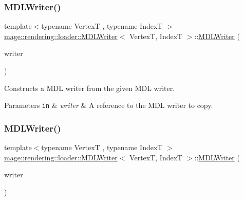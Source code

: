 \subsubsection{\texorpdfstring{M\+D\+L\+Writer()}{MDLWriter()}\hspace{0.1cm}{\footnotesize\ttfamily [2/3]}}
{\footnotesize\ttfamily template$<$typename VertexT , typename IndexT $>$ \\
\hyperlink{classmage_1_1rendering_1_1loader_1_1_m_d_l_writer}{mage\+::rendering\+::loader\+::\+M\+D\+L\+Writer}$<$ VertexT, IndexT $>$\+::\hyperlink{classmage_1_1rendering_1_1loader_1_1_m_d_l_writer}{M\+D\+L\+Writer} (\begin{DoxyParamCaption}\item[{const \hyperlink{classmage_1_1rendering_1_1loader_1_1_m_d_l_writer}{M\+D\+L\+Writer}$<$ VertexT, IndexT $>$ \&}]{writer }\end{DoxyParamCaption})\hspace{0.3cm}{\ttfamily [delete]}}

Constructs a M\+DL writer from the given M\+DL writer.


\begin{DoxyParams}[1]{Parameters}
\mbox{\tt in}  & {\em writer} & A reference to the M\+DL writer to copy. \\
\hline
\end{DoxyParams}
\hypertarget{classmage_1_1rendering_1_1loader_1_1_m_d_l_writer_a27f71b3a27f96e263948d19b8b570309}{}\label{classmage_1_1rendering_1_1loader_1_1_m_d_l_writer_a27f71b3a27f96e263948d19b8b570309} 
\subsubsection{\texorpdfstring{M\+D\+L\+Writer()}{MDLWriter()}\hspace{0.1cm}{\footnotesize\ttfamily [3/3]}}
{\footnotesize\ttfamily template$<$typename VertexT , typename IndexT $>$ \\
\hyperlink{classmage_1_1rendering_1_1loader_1_1_m_d_l_writer}{mage\+::rendering\+::loader\+::\+M\+D\+L\+Writer}$<$ VertexT, IndexT $>$\+::\hyperlink{classmage_1_1rendering_1_1loader_1_1_m_d_l_writer}{M\+D\+L\+Writer} (\begin{DoxyParamCaption}\item[{\hyperlink{classmage_1_1rendering_1_1loader_1_1_m_d_l_writer}{M\+D\+L\+Writer}$<$ VertexT, IndexT $>$ \&\&}]{writer }\end{DoxyParamCaption})\hspace{0.3cm}{\ttfamily [noexcept]}}

